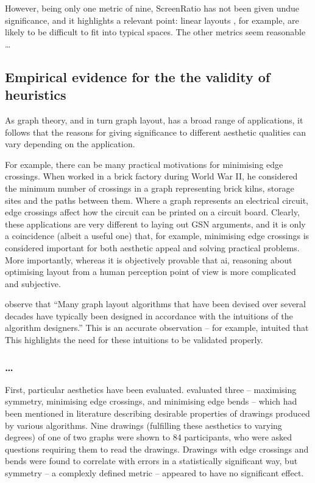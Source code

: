 However, being only one metric of nine, ScreenRatio has not been given undue significance, and it highlights a relevant point: linear layouts , for example, are likely to be difficult to fit into typical spaces.
The other metrics seem reasonable \ldots


\subsection{Empirical evidence for the the validity of heuristics}

As graph theory, and in turn graph layout, has a broad range of applications, it follows that the reasons for giving significance to different aesthetic qualities can vary depending on the application.

For example, there can be many practical motivations for minimising edge crossings.
When \citet{JGT:JGT3190010105} worked in a brick factory during World War II,
he considered the minimum number of crossings in a graph representing
brick kilns, storage sites and the paths between them.
Where a graph represents an electrical circuit, edge crossings affect how the circuit can be printed on a circuit board.
Clearly, these applications are very different to laying out GSN arguments, and it is only a coincidence (albeit a useful one) that, for example, minimising edge crossings is considered important for both aesthetic appeal and solving practical problems.
More importantly, whereas it is objectively provable that ai, reasoning about optimising layout from a human perception point of view is more complicated and subjective.

\citet{5674033} observe that ``Many graph layout algorithms that have been devised over
several decades have typically been designed in accordance with the intuitions of the algorithm designers.''
This is an accurate observation -- for example, \citet{eades84} intuited that 
This highlights the need for these intuitions to be validated properly.

\subsubsection{\ldots}

First, particular aesthetics have been evaluated. \citet{Purchase1997basis} evaluated three -- maximising symmetry, minimising edge crossings, and minimising edge bends -- which had been mentioned in literature describing desirable properties of drawings produced by various algorithms. 
Nine drawings (fulfilling these aesthetics to varying degrees) of one of two graphs were shown to 84 participants,
who were asked questions requiring them to read the drawings.
Drawings with edge crossings and bends were found to correlate with errors in a statistically significant way, but symmetry -- a complexly defined metric -- appeared to have no significant effect.

